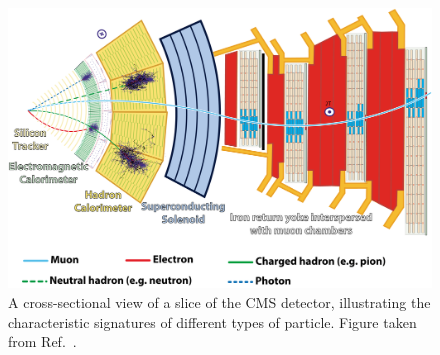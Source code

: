 \begin{figure}[h!]
  \centering
  \includegraphics[width=\textwidth]{Figures/Detector/CMSslice.png}
  \caption[A cross-sectional view of the CMS detector]
  {
    A cross-sectional view of a slice of the CMS detector, 
    illustrating the characteristic signatures of different types of particle.
    Figure taken from Ref.~\cite{CMSslice}.
  }
  \label{fig:detector_CMSslice}
\end{figure}


